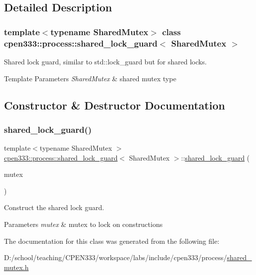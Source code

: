 \subsection{Detailed Description}
\subsubsection*{template$<$typename Shared\+Mutex$>$\newline
class cpen333\+::process\+::shared\+\_\+lock\+\_\+guard$<$ Shared\+Mutex $>$}

Shared lock guard, similar to std\+::lock\+\_\+guard but for shared locks. 


\begin{DoxyTemplParams}{Template Parameters}
{\em Shared\+Mutex} & shared mutex type \\
\hline
\end{DoxyTemplParams}


\subsection{Constructor \& Destructor Documentation}
\mbox{\label{classcpen333_1_1process_1_1shared__lock__guard_a263fb59ac82aea8a400239ec7c238a14}} 
\subsubsection{\texorpdfstring{shared\+\_\+lock\+\_\+guard()}{shared\_lock\_guard()}}
{\footnotesize\ttfamily template$<$typename Shared\+Mutex $>$ \\
\hyperlink{classcpen333_1_1process_1_1shared__lock__guard}{cpen333\+::process\+::shared\+\_\+lock\+\_\+guard}$<$ Shared\+Mutex $>$\+::\hyperlink{classcpen333_1_1process_1_1shared__lock__guard}{shared\+\_\+lock\+\_\+guard} (\begin{DoxyParamCaption}\item[{Shared\+Mutex \&}]{mutex }\end{DoxyParamCaption})\hspace{0.3cm}{\ttfamily [inline]}}



Construct the shared lock guard. 


\begin{DoxyParams}{Parameters}
{\em mutex} & mutex to lock on constructions \\
\hline
\end{DoxyParams}


The documentation for this class was generated from the following file\+:\begin{DoxyCompactItemize}
\item 
D\+:/school/teaching/\+C\+P\+E\+N333/workspace/labs/include/cpen333/process/\hyperlink{process_2shared__mutex_8h}{shared\+\_\+mutex.\+h}\end{DoxyCompactItemize}
